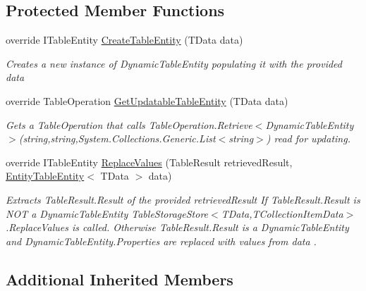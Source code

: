 \subsection*{Protected Member Functions}
\begin{DoxyCompactItemize}
\item 
override I\+Table\+Entity \hyperlink{classCqrs_1_1Azure_1_1Storage_1_1DataStores_1_1TableStorageDataStore_abf8e295af6e0925f1c9c3550b931a4a8_abf8e295af6e0925f1c9c3550b931a4a8}{Create\+Table\+Entity} (T\+Data data)
\begin{DoxyCompactList}\small\item\em Creates a new instance of Dynamic\+Table\+Entity populating it with the provided {\itshape data}  \end{DoxyCompactList}\item 
override Table\+Operation \hyperlink{classCqrs_1_1Azure_1_1Storage_1_1DataStores_1_1TableStorageDataStore_a54f00f53521e285568f19c29527d6466_a54f00f53521e285568f19c29527d6466}{Get\+Updatable\+Table\+Entity} (T\+Data data)
\begin{DoxyCompactList}\small\item\em Gets a Table\+Operation that calls Table\+Operation.\+Retrieve$<$\+Dynamic\+Table\+Entity$>$(string,string,\+System.\+Collections.\+Generic.\+List$<$string$>$) read for updating. \end{DoxyCompactList}\item 
override I\+Table\+Entity \hyperlink{classCqrs_1_1Azure_1_1Storage_1_1DataStores_1_1TableStorageDataStore_ae9aeb3daf2648a03db25f2a3ddfd87ee_ae9aeb3daf2648a03db25f2a3ddfd87ee}{Replace\+Values} (Table\+Result retrieved\+Result, \hyperlink{classCqrs_1_1Azure_1_1BlobStorage_1_1EntityTableEntity}{Entity\+Table\+Entity}$<$ T\+Data $>$ data)
\begin{DoxyCompactList}\small\item\em Extracts Table\+Result.\+Result of the provided {\itshape retrieved\+Result}  If Table\+Result.\+Result is N\+OT a Dynamic\+Table\+Entity Table\+Storage\+Store$<$\+T\+Data,\+T\+Collection\+Item\+Data$>$.\+Replace\+Values is called. Otherwise Table\+Result.\+Result is a Dynamic\+Table\+Entity and Dynamic\+Table\+Entity.\+Properties are replaced with values from {\itshape data} . \end{DoxyCompactList}\end{DoxyCompactItemize}
\subsection*{Additional Inherited Members}


